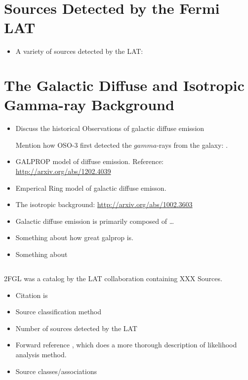 
\section{Sources Detected by the Fermi \acrlong{LAT}}

\begin{itemize}
  \item A variety of sources detected by the \Acrlong{LAT}:
\end{itemize}

\section{The Galactic Diffuse and Isotropic Gamma-ray Background}


\begin{itemize}
  \item Discuss the historical Observations of galactic diffuse emission

    Mention how \gls{OSO-3} first detected the $gamma$-rays from the galaxy: .


  \item GALPROP model of diffuse emission.
  Reference: \url{http://arxiv.org/abs/1202.4039}
  \item Emperical Ring model of galactic diffuse emisson.
  \item The isotropic background: \url{http://arxiv.org/abs/1002.3603}
\end{itemize}

\begin{itemize}
  \item Galactic diffuse emission is primarily composed of \ldots
  \item Something about how great galprop is.
  \item Something about
\end{itemize}


\subsection{}

\Gls{2FGL} was a catalog by the LAT collaboration containing XXX Sources.

\begin{itemize}
  \item Citation is \cite{nolan_2012_fermi-large}
  \item Source classification method
  \item Number of sources detected by the \gls{LAT}
  \item Forward reference ,
    which does a more thorough description of likelihood analysis method.
  \item Source classes/associations
\end{itemize}

